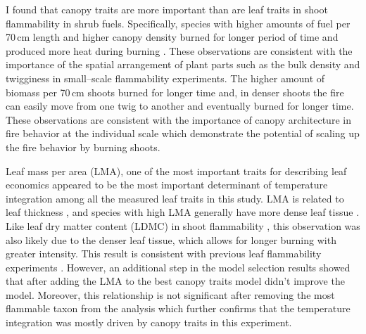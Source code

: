 \documentclass{ttuthes2007}
\begin{document}
I found that canopy traits are more important than are leaf traits in shoot flammability in shrub fuels. %
Specifically, species with higher amounts of fuel per 70\,cm length and higher canopy density burned for longer period of time and produced more heat during burning . These observations are consistent with the importance of the spatial arrangement of plant parts such as the bulk density \citep{pausas2012firesulex} and twigginess \citep{potts2022growth} in small--scale flammability experiments. The higher amount of biomass per 70\,cm shoots burned for longer time and, in denser shoots the fire can easily move from one twig to another and eventually burned for longer time. These observations are  consistent with the importance of canopy architecture in fire behavior at the individual scale \citep{madrigal2012evaluation} which demonstrate the potential of scaling up the fire behavior by burning shoots.





Leaf mass per area (LMA), one of the most important traits for describing leaf economics %
\citep{wright2004worldwide} appeared to be the most important determinant of temperature integration among all the measured leaf traits in this study. LMA is related to leaf thickness \citep{niinemets1999research}, and species with high LMA generally have more dense leaf tissue \citep{poorter2009causes}. Like leaf dry matter content (LDMC) in shoot flammability \citep{alam2020shoot, potts2022growth}, this observation
was also likely due to the denser leaf tissue, which allows for longer burning with greater intensity. This result is consistent with previous leaf flammability experiments \citep{krix2018landscape}.
However, an additional step in the model selection results showed that after adding the LMA to the best canopy traits model didn't improve the model.
Moreover, this relationship is not significant %
after removing the most flammable taxon from the analysis which further confirms that the temperature integration was mostly driven by canopy traits in this experiment.\\
\end{document}

